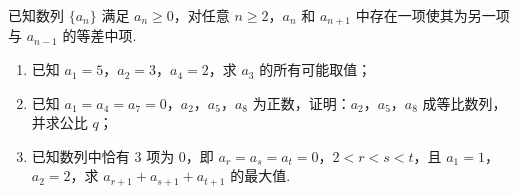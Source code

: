\begin{problem}
已知数列 \(\{a_n\}\) 满足 \(a_n\ge0\)，对任意 \(n\ge2\)，\(a_n\) 和 \(a_{n+1}\) 中存在一项使其为另一项与 \(a_{n-1}\) 的等差中项.
\begin{enumerate}
\item 已知 \(a_1=5\)，\(a_2=3\)，\(a_4=2\)，求 \(a_3\) 的所有可能取值；
\item 已知 \(a_1=a_4=a_7=0\)，\(a_2\)，\(a_5\)，\(a_8\) 为正数，证明：\(a_2\)，\(a_5\)，\(a_8\) 成等比数列，并求公比 \(q\)；
\item 已知数列中恰有 \(3\) 项为 \(0\)，即 \(a_r=a_s=a_t=0\)，\(2<r<s<t\)，且 \(a_1=1\)，\(a_2=2\)，求 \(a_{r+1}+a_{s+1}+a_{t+1}\) 的最大值.
\end{enumerate}
\end{problem}

\begin{solution}

\end{solution}
